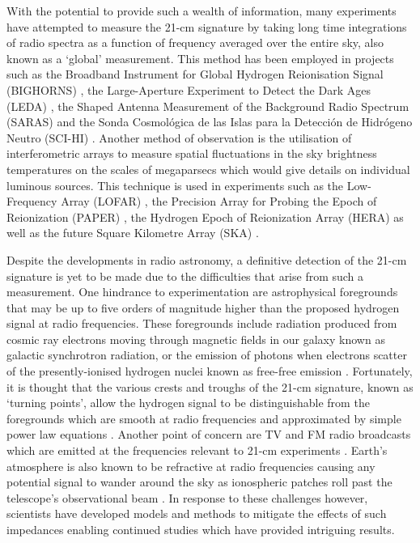 With the potential to provide such a wealth of information, many experiments have attempted to measure the 21-cm signature by taking long time integrations of radio spectra as a function of frequency averaged over the entire sky, also known as a ‘global’ measurement. This method has been employed in projects such as the Broadband Instrument for Global Hydrogen Reionisation Signal (BIGHORNS) \citep{bighorns}, the Large-Aperture Experiment to Detect the Dark Ages (LEDA) \citep{leda}, the Shaped Antenna Measurement of the Background Radio Spectrum (SARAS) \citep{saras} and the Sonda Cosmol\'{o}gica de las Islas para la Detecci\'{o}n de Hidr\'{o}geno Neutro (SCI-HI) \citep{scihi}. Another method of observation is the utilisation of interferometric arrays to measure spatial fluctuations in the sky brightness temperatures on the scales of megaparsecs which would give details on individual luminous sources. This technique is used in experiments such as the Low-Frequency Array (LOFAR) \citep{lofar}, the Precision Array for Probing the Epoch of Reionization (PAPER) \citep{paper}, the Hydrogen Epoch of Reionization Array (HERA) \citep{hera} as well as the future Square Kilometre Array (SKA) \citep{ska}.

Despite the developments in radio astronomy, a definitive detection of the 21-cm signature is yet to be made due to the difficulties that arise from such a measurement. One hindrance to experimentation are astrophysical foregrounds that may be up to five orders of magnitude higher than the proposed hydrogen signal at radio frequencies. These foregrounds include radiation produced from cosmic ray electrons moving through magnetic fields in our galaxy known as galactic synchrotron radiation, or the emission of photons when electrons scatter of the presently-ionised hydrogen nuclei known as free-free emission \citep{foregrounds,edges}. Fortunately, it is thought that the various crests and troughs of the 21-cm signature, known as ‘turning points’, allow the hydrogen signal to be distinguishable from the foregrounds which are smooth at radio frequencies and approximated by simple power law equations \citep{edgesNature}. Another point of concern are TV and FM radio broadcasts which are emitted at the frequencies relevant to 21-cm experiments \citep{reach}. Earth’s atmosphere is also known to be refractive at radio frequencies causing any potential signal to wander around the sky as ionospheric patches roll past the telescope’s observational beam \citep{lofar}. In response to these challenges however, scientists have developed models and methods to mitigate the effects of such impedances enabling continued studies which have provided intriguing results.


